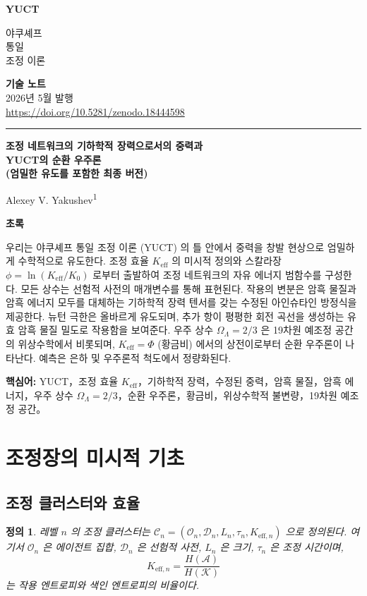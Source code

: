 \documentclass[12pt,a4paper]{article}
\newtheorem{definition}[theorem]{정의}
\newcommand{\Dir}{\mathcal{D}}
\newcommand{\makeheader}{%
	\noindent
	\begin{minipage}{0.17\textwidth}
		\raggedright
		{\sffamily\bfseries\color{skyblue}\fontsize{46}{46}\selectfont YUCT}%
	\end{minipage}%
	\hspace{30pt}
	\begin{minipage}{0.32\textwidth}
		\raggedright
		{\sffamily\fontsize{11}{13}\selectfont 야쿠셰프\\ 통일\\ 조정 이론}%
	\end{minipage}%
	\hfill
	\begin{minipage}{0.38\textwidth}
		\raggedleft
		{\sffamily\bfseries 기술 노트}\\ 
		{\sffamily 2026년 5월 발행}\\ 
		{\sffamily\footnotesize \scriptsize\url{https://doi.org/10.5281/zenodo.18444598}}%
	\end{minipage}
	\par\vspace{5pt}
	\noindent\textcolor{gold}{\rule{\textwidth}{1.6pt}}
	\par\vspace{0pt}
}
\begin{document}
	\thispagestyle{firstpage}
	\makeheader
	
	\vspace{0cm}
	{\LARGE\bfseries 조정 네트워크의 기하학적 장력으로서의 중력과\\
		YUCT의 순환 우주론 \\
		(엄밀한 유도를 포함한 최종 버전)\par}
	\vspace{0.2cm}
	
	{\large Alexey V. Yakushev\textsuperscript{1}} \\
	\vspace{0.0cm}
	
	{\color{darkblue}\textbf{\LARGE 초록}} \par
	{\large
		\noindent
		우리는 야쿠셰프 통일 조정 이론 (YUCT) 의 틀 안에서 중력을 창발 현상으로 엄밀하게 수학적으로 유도한다. 조정 효율 \(K_{\mathrm{eff}}\) 의 미시적 정의와 스칼라장 \(\phi = \ln (K_{\mathrm{eff}}/K_0)\) 로부터 출발하여 조정 네트워크의 자유 에너지 범함수를 구성한다. 모든 상수는 선험적 사전의 매개변수를 통해 표현된다. 작용의 변분은 암흑 물질과 암흑 에너지 모두를 대체하는 기하학적 장력 텐서를 갖는 수정된 아인슈타인 방정식을 제공한다. 뉴턴 극한은 올바르게 유도되며, 추가 항이 평평한 회전 곡선을 생성하는 유효 암흑 물질 밀도로 작용함을 보여준다. 우주 상수 \(\Omega_\Lambda = 2/3\) 은 19차원 예조정 공간의 위상수학에서 비롯되며, \(K_{\mathrm{eff}} = \Phi\) (황금비) 에서의 상전이로부터 순환 우주론이 나타난다. 예측은 은하 및 우주론적 척도에서 정량화된다.}
	
	\vspace{0.1cm}
	\noindent
	{\color{darkblue}\textbf{핵심어:}} YUCT，조정 효율 \(K_{\mathrm{eff}}\)，기하학적 장력，수정된 중력，암흑 물질，암흑 에너지，우주 상수 \(\Omega_\Lambda=2/3\)，순환 우주론，황금비，위상수학적 불변량，19차원 예조정 공간。
	
	\vspace{0.4cm}
	
	\tableofcontents
	
	\section{조정장의 미시적 기초}
	
	\subsection{조정 클러스터와 효율}
	\begin{definition}
		레벨 \(n\) 의 조정 클러스터는 \(\mathcal{C}_n = (\mathcal{O}_n, \Dir_n, L_n, \tau_n, K_{\mathrm{eff},n})\) 으로 정의된다. 여기서 \(\mathcal{O}_n\) 은 에이전트 집합, \(\Dir_n\) 은 선험적 사전, \(L_n\) 은 크기, \(\tau_n\) 은 조정 시간이며,
		\[
		K_{\mathrm{eff},n} = \frac{H(\mathcal{A})}{H(\mathcal{K})}
		\]
		는 작용 엔트로피와 색인 엔트로피의 비율이다.
	\end{definition}
	
\end{document}
